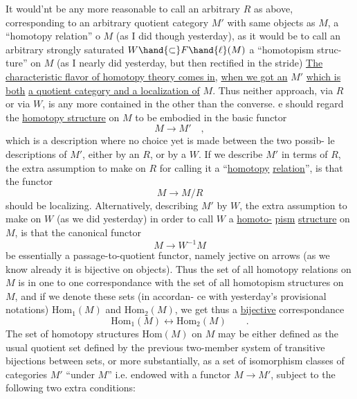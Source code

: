 It would'nt be any more reasonable to call an arbitrary $R$ as above,
corresponding to an arbitrary quotient category $M'$ with same objects as
$M$, a ``homotopy relation'' o $M$ (as I did though yesterday), as it would
be to call an arbitrary strongly saturated $W\hand{\subset}F\hand{\ell}(M)$ a ``homotopism struc-%
ture'' on $M$ (as I nearly did yesterday, but then rectified in the stride)
\uline{The characteristic flavor of homotopy theory comes in}, \uline{when we got an}
$M'$ \uline{which is} \uline{both} \uline{a quotient category and a localization of} $M$. Thus 
neither approach, via $R$ or via $W$, is any more contained in the other\hand{,}
than  the converse. e should regard the \uline{homotopy structure} on $M$ to
be embodied in the basic functor
\[ M \longrightarrow M' \quad , \]
which is a description where no choice yet is made between the two possib-%
le descriptions of $M'$, either by an $R$, or by a $W$. If we describe $M'$ in
terms of $R$, the extra assumption to make on $R$ for calling it a ``\uline{homotopy}
\uline{relation}'', is  that the  functor
\[ M \longrightarrow M/R \]
should be localizing. Alternatively, describing $M'$ by $W$, the extra
assumption to make on $W$ (as we did yesterday) in order to call $W$ a \uline{homoto-}%
\uline{pism} \uline{structure} on $M$, is that the canonical  functor
\[ M \longrightarrow W^{-1}M \]
be essentially a passage-to-quotient functor, namely jective on arrows
(as we know already it is bijective on objects). Thus the set of all
homotopy relations on $M$ is in one to one correspondance with the set of
all homotopism structures on $M$, and if we denote these sets (in accordan-%
ce with yesterday's provisional notations) $\mathrm{Hom}_1(M)$ and $\mathrm{Hom}_2(M)$, we get
thus a \uline{bijective} correspondance
\[ \mathrm{Hom}_1(M) \longleftrightarrow \mathrm{Hom}_2(M) \qquad . \]
The set of homotopy structures $\mathrm{Hom}(M)$ on $M$ may be either defined as the
usual quotient set defined by the previous two-member system of transitive
bijections between sets, or more substantially, as a set of isomorphism
classes of categories $M'$ ``under $M$'' i.e. endowed with a functor $M\to M'$,
 subject to the following two extra conditions:

